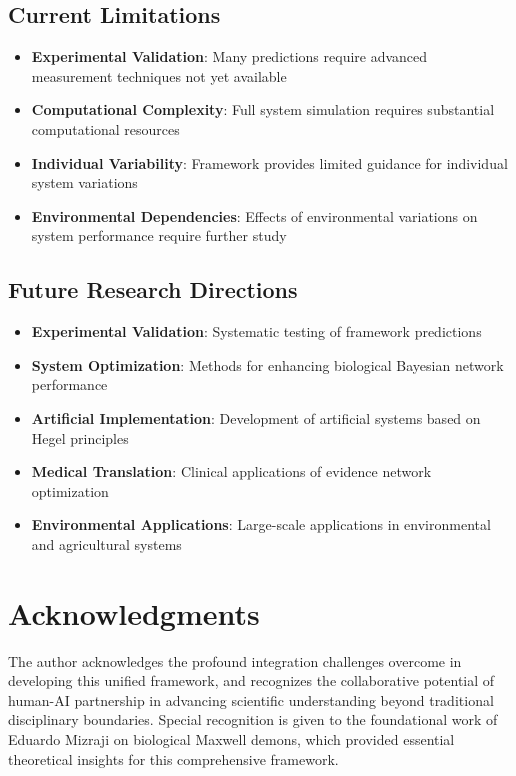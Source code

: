 \documentclass[12pt,a4paper]{article}
\begin{document}
\subsection{Current Limitations}

\begin{itemize}
\item \textbf{Experimental Validation}: Many predictions require advanced measurement techniques not yet available
\item \textbf{Computational Complexity}: Full system simulation requires substantial computational resources
\item \textbf{Individual Variability}: Framework provides limited guidance for individual system variations
\item \textbf{Environmental Dependencies}: Effects of environmental variations on system performance require further study
\end{itemize}

\subsection{Future Research Directions}

\begin{itemize}
\item \textbf{Experimental Validation}: Systematic testing of framework predictions
\item \textbf{System Optimization}: Methods for enhancing biological Bayesian network performance
\item \textbf{Artificial Implementation}: Development of artificial systems based on Hegel principles
\item \textbf{Medical Translation}: Clinical applications of evidence network optimization
\item \textbf{Environmental Applications}: Large-scale applications in environmental and agricultural systems
\end{itemize}


\section*{Acknowledgments}

The author acknowledges the profound integration challenges overcome in developing this unified framework, and recognizes the collaborative potential of human-AI partnership in advancing scientific understanding beyond traditional disciplinary boundaries. Special recognition is given to the foundational work of Eduardo Mizraji on biological Maxwell demons, which provided essential theoretical insights for this comprehensive framework.
\end{document}
